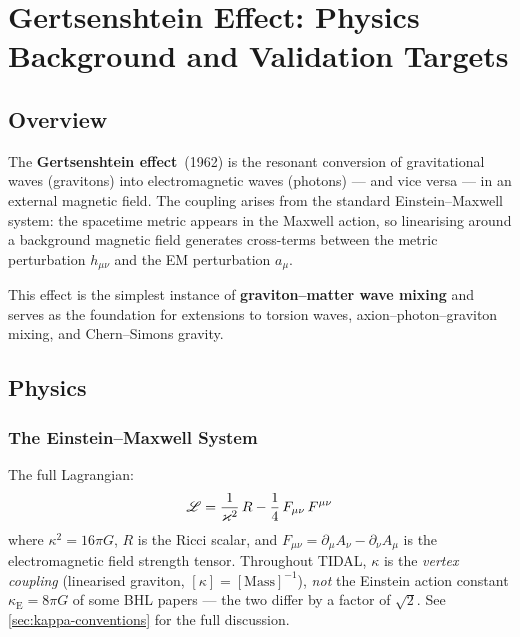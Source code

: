 
\section{Gertsenshtein Effect: Physics Background and Validation Targets}
\label{sec:gertsenshtein}

\subsection{Overview}
\label{subsec:gertsenshtein-overview}

The \textbf{Gertsenshtein effect}~(1962) is the resonant conversion of gravitational waves (gravitons) into electromagnetic waves (photons) --- and vice versa --- in an external magnetic field. The coupling arises from the standard Einstein--Maxwell system: the spacetime metric appears in the Maxwell action, so linearising around a background magnetic field generates cross-terms between the metric perturbation $h_{\mu\nu}$ and the EM perturbation $a_\mu$.

This effect is the simplest instance of \textbf{graviton--matter wave mixing} and serves as the foundation for extensions to torsion waves, axion--photon--graviton mixing, and Chern--Simons gravity.

\subsection{Physics}
\label{subsec:gertsenshtein-physics}

\subsubsection{The Einstein--Maxwell System}
\label{subsec:einstein-maxwell}

The full Lagrangian:
\begin{equation}
  \mathscr{L} = \frac{1}{\varkappa^2}\, R - \frac{1}{4}\, F_{\mu\nu}\, F^{\mu\nu}
  \label{eq:gertsenshtein-lagrangian}
\end{equation}
where $\kappa^2 = 16\pi G$, $R$ is the Ricci scalar, and $F_{\mu\nu} = \partial_\mu A_\nu - \partial_\nu A_\mu$ is the electromagnetic field strength tensor. Throughout TIDAL, $\kappa$ is the \emph{vertex coupling} (linearised graviton, $[\kappa] = [\text{Mass}]^{-1}$), \emph{not} the Einstein action constant $\kappa_\text{E} = 8\pi G$ of some BHL papers — the two differ by a factor of $\sqrt{2}$. See \cref{sec:kappa-conventions} for the full discussion.

